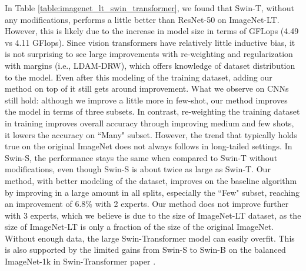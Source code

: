 In Table \ref{table:imagenet_lt_swin_transformer}, we found that Swin-T, without any modifications, performs a little better than ResNet-50 on ImageNet-LT. However, this is likely due to the increase in model size in terms of GFLops (4.49 vs 4.11 GFlops). Since vision transformers have relatively little inductive bias, it is not surprising to see large improvements with re-weighting and regularization with margins (i.e., LDAM-DRW), which offers knowledge of dataset distribution to the model. Even after this modeling of the training dataset, adding our method on top of it still gets around  improvement. What we observe on CNNs still hold: although we improve a little more in few-shot, our method improves the model in terms of three subsets. In contrast, re-weighting the training dataset in training improves overall accuracy through improving medium and few shots, it lowers the accuracy on ``Many" subset.  However, the trend that typically holds true on the original ImageNet does not always follows in long-tailed settings. In Swin-S, the performance stays the same when compared to Swin-T without modifications, even though Swin-S is about twice as large as Swin-T. Our method, with better modeling of the dataset, improves on the baseline algorithm by improving in a large amount in all splits, especially the ``Few" subset, reaching an improvement of 6.8\% with 2 experts. Our method does not improve further with 3 experts, which we believe is due to the size of ImageNet-LT dataset, as the size of ImageNet-LT is only a fraction of the size of the original ImageNet. Without enough data, the large Swin-Transformer model can easily overfit. This is also supported by the limited gains from Swin-S to Swin-B on the balanced ImageNet-1k in Swin-Transformer paper \cite{liu2021swin}.
